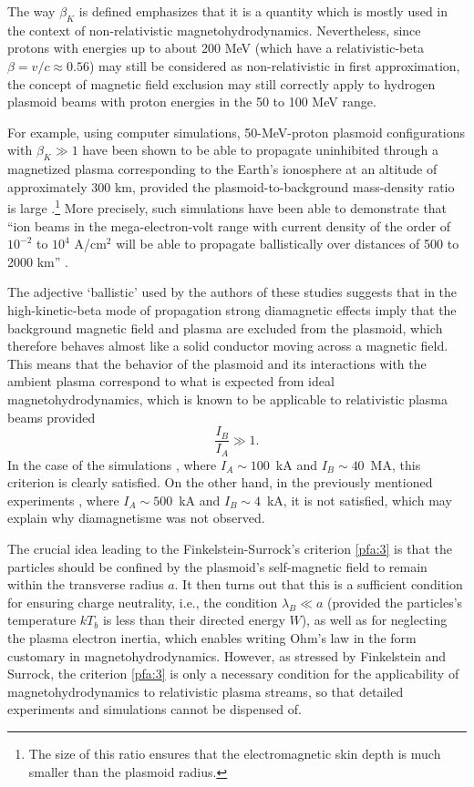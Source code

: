 \documentclass [12pt,a4paper,     ]{report} %
\begin{document}
   The way $\beta_K$ is defined emphasizes that it is a quantity which is mostly used in the context of non-relativistic magnetohydrodynamics.  Nevertheless, since protons with energies up to about 200 MeV (which have a relativistic-beta $\beta=v/c\approx 0.56$) may still be considered as non-relativistic in first approximation, the concept of magnetic field exclusion may still correctly apply to hydrogen plasmoid beams with proton energies in the 50 to 100 MeV range.  

   For example, using computer simulations, 50-MeV-proton plasmoid configurations with $\beta_K \gg 1$ have been shown to be able to propagate uninhibited through a magnetized plasma corresponding to the Earth's ionosphere at an altitude of approximately 300 km, provided the plasmoid-to-background mass-density ratio is large \cite{PAPAD1988-}.\footnote{The size of this ratio ensures that the electromagnetic skin depth is much smaller than the plasmoid radius.}  More precisely, such simulations have been able to demonstrate that ``ion beams in the mega-electron-volt range with current density of the order of $10^{-2}$ to $10^{4}$ A/cm$^2$ will be able to propagate ballistically over distances of 500 to 2000 km'' \cite[p.1090]{PAPAD1991-}.

   The adjective `ballistic' used by the authors of these studies suggests that in the high-kinetic-beta mode of propagation strong diamagnetic effects imply that the background magnetic field and plasma are excluded from the plasmoid, which therefore behaves almost like a solid conductor moving across a magnetic field.  This means that the behavior of the plasmoid and its interactions with the ambient plasma correspond to what is expected from ideal magnetohydrodynamics, which is known to be applicable to relativistic plasma beams provided \cite[Appendix]{FINKE1961-} 
%
\begin{equation}\label{pfa:3} 
        \frac{I_B}{I_A} \gg 1.
\end{equation}
%
In the case of the simulations \cite{PAPAD1991-}, where $I_A \sim 100$~kA and $I_B \sim 40$~MA, this criterion is clearly satisfied.  On the other hand, in the previously mentioned experiments \cite{HONG-1988-, WESSE1988-}, where $I_A \sim 500$~kA and $I_B \sim 4$~kA, it is not satisfied, which may explain why diamagnetisme was not observed.

   The crucial idea leading to the Finkelstein-Surrock's criterion \eqref{pfa:3} is that the particles should be confined by the plasmoid's self-magnetic field to remain within the transverse radius $a$.  It then turns out that this is a sufficient condition for ensuring charge neutrality, i.e., the condition $\lambda_B \ll a$ (provided the particles's temperature $kT_b$ is less than their directed energy $W$), as well as for neglecting the plasma electron inertia, which enables writing Ohm's law in the form customary in magnetohydrodynamics.  However, as stressed by Finkelstein and Surrock, the  criterion \eqref{pfa:3} is only a necessary condition for the applicability of magnetohydrodynamics to relativistic plasma streams, so that detailed experiments and simulations cannot be dispensed of.
\end{document}
